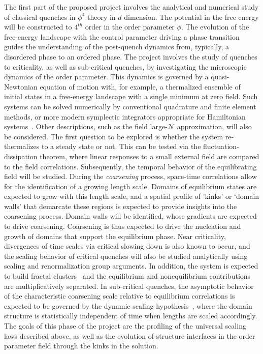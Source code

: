 \documentclass[a4paper,10pt]{report}
\begin{document}
The first part of the proposed project involves the analytical and numerical study of classical quenches in $\phi^4$ theory in  {$d$} 
dimension. The potential in the free energy will be constructed to $4^{th}$ order in the order parameter $\phi$. The evolution of the free-energy landscape with the control parameter driving a phase transition guides the understanding of the post-quench dynamics from, typically, a disordered phase to an ordered phase. The project involves the study of quenches to criticality, as well as sub-critical quenches, by investigating the microscopic dynamics of the order parameter. This dynamics is governed by a quasi-Newtonian equation of motion with,  {for example, a thermalized ensemble of initial states in a free-energy landscape with a single minimum at zero field}. Such systems can be solved numerically by conventional quadrature and finite element methods, or more modern symplectic integrators appropriate for Hamiltonian systems~\cite{symplectic}.  Other descriptions, such as the field large-$\mathcal{N}$ approximation, will also be considered.  The first question to be explored is whether the system re-thermalizes to a steady state or not. This can be tested via the fluctuation-dissipation theorem, where linear responses to a small external field are compared to the field correlations. Subsequently, the temporal behavior of the equilibrating field will be studied. During the \textit{coarsening} process, space-time correlations allow for the identification of a growing length scale. Domains of equilibrium states are expected to grow with this length scale, and a spatial profile of 'kinks' or  {`domain walls'} that demarcate these regions is expected to provide insights into the coarsening process. Domain walls will be identified, whose gradients are expected to drive coarsening. Coarsening is thus expected to drive the nucleation and growth of domains that support the equilibrium phase. Near criticality, divergences of time scales via critical slowing down is also known to occur, and the scaling behavior of critical quenches will also be studied analytically using scaling and renormalization group arguments. In addition, the system is expected to build fractal clusters~\cite{fractal} and the equilibrium and nonequilibrium contributions are multiplicatively separated. In sub-critical quenches, the asymptotic behavior of the characteristic coarsening scale relative to equilibrium correlations is expected to be governed by the dynamic scaling hypothesis~\cite{dynscal}, where the domain structure is statistically independent of time when lengths are scaled accordingly. The goals of this phase of the project are the profiling of the universal scaling laws described above, as well as the evolution of structure interfaces in the order parameter field through the kinks in the solution.
\end{document}
